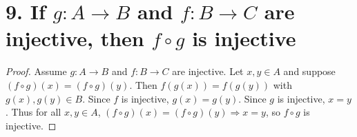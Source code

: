 \section*{9. If $g:A\to B$ and $f:B\to C$ are injective, then $f\circ g$ is injective}

\begin{proof}
Assume $g:A\to B$ and $f:B\to C$ are injective. 
Let $x,y\in A$ and suppose $(f\circ g)(x)=(f\circ g)(y)$.
Then $f(g(x))=f(g(y))$ with $g(x),g(y)\in B$. 
Since $f$ is injective, $g(x)=g(y)$. 
Since $g$ is injective, $x=y$.
Thus for all $x,y\in A$, $(f\circ g)(x)=(f\circ g)(y)\Rightarrow x=y$, 
so $f\circ g$ is injective.
\end{proof}
